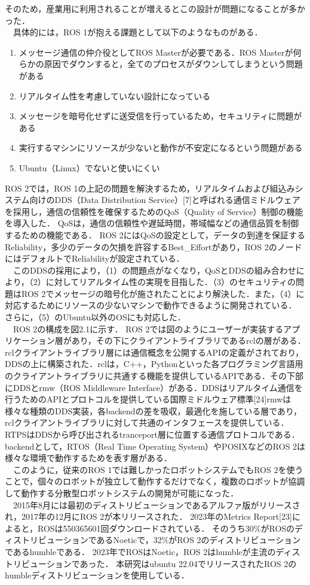 そのため，産業用に利用されることが増えるとこの設計が問題になることが多かった．
\\　具体的には，ROS 1が抱える課題として以下のようなものがある．
   \begin{enumerate}
       \item メッセージ通信の仲介役としてROS Masterが必要である．ROS Masterが何らかの原因でダウンすると，全てのプロセスがダウンしてしまうという問題がある
       \item リアルタイム性を考慮していない設計になっている
       \item メッセージを暗号化せずに送受信を行っているため，セキュリティに問題がある
       \item 実行するマシンにリソースが少ないと動作が不安定になるという問題がある
       \item Ubuntu（Linux）でないと使いにくい
   \end{enumerate}
ROS 2では，ROS 1の上記の問題を解決するため，リアルタイムおよび組込みシステム向けのDDS（Data Distribution Service）[7]と呼ばれる通信ミドルウェアを採用し，通信の信頼性を確保するためのQoS（Quality of Service）制御の機能を導入した．
QoSは，通信の信頼性や遅延時間，帯域幅などの通信品質を制御するための機能である．
ROS 2にはQoSの設定として，データの到達を保証するReliability，多少のデータの欠損を許容するBest\_Effortがあり，ROS 2のノードにはデフォルトでReliabilityが設定されている．
\\　このDDSの採用により，（1）の問題点がなくなり，QoSとDDSの組み合わせにより，（2）に対してリアルタイム性の実現を目指した．（3）のセキュリティの問題はROS 2でメッセージの暗号化が施されたことにより解決した．また，（4）に対応するためにリソースの少ないマシンで動作できるように開発されている．
さらに，（5）のUbuntu以外のOSにも対応した．
\\　ROS 2の構成を図2.1に示す．
ROS 2では図のようにユーザーが実装するアプリケーション層があり，その下にクライアントライブラリであるrclの層がある．rclクライアントライブラリ層には通信概念を公開するAPIの定義がされており，DDSの上に構築された．rclは，C++，Pythonといった各プログラミング言語用のクライアントライブラリに共通する機能を提供しているAPIである．その下部にDDSとrmw（ROS Middleware Interface）がある．DDSはリアルタイム通信を行うためのAPIとプロトコルを提供している国際ミドルウェア標準[24]rmwは様々な種類のDDS実装，各backendの差を吸収，最適化を施している層であり，rclクライアントライブラリに対して共通のインタフェースを提供している．RTPSはDDSから呼び出されるtranceport層に位置する通信プロトコルである．backendとして，RTOS（Real Time Operating System）やPOSIXなどのROS 2は様々な環境で動作するためを表す層がある．
\\　このように，従来のROS 1では難しかったロボットシステムでもROS 2を使うことで，個々のロボットが独立して動作するだけでなく，複数のロボットが協調して動作する分散型ロボットシステムの開発が可能になった．
\\　2015年8月には最初のディストリビューションであるアルファ版がリリースされ，2017年の12月にROS 2が本リリースされた．
2023年のMetrics Report[23]によると，ROSは550365601回ダウンロードされている．
そのうち30\%がROSのディストリビューションであるNoeticで，32\%がROS 2のディストリビューションであるhumbleである．
2023年でROSはNoetic，ROS 2はhumbleが主流のディストリビューションであった．
本研究はubuntu 22.04でリリースされたROS 2のhumbleディストリビューションを使用している．
